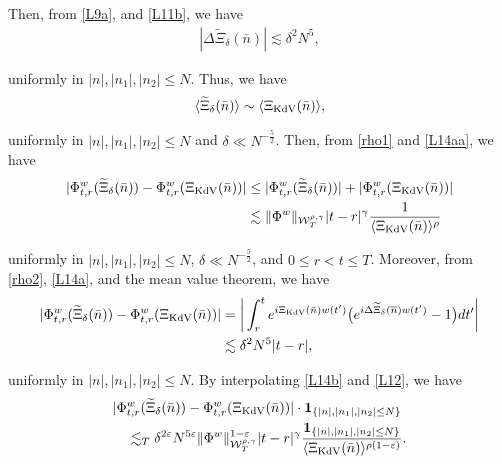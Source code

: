 \documentclass[letterpaper, 11pt,  reqno]{amsart}
\newcommand{\1}{\hspace{0.5mm}\text{I}\hspace{0.5mm}}
\newcommand{\noi}{\noindent}
\newcommand{\dl}{\delta}
\newcommand{\Dl}{\Delta}
\newcommand{\eps}{\varepsilon}
\newcommand{\g}{\gamma}
\newcommand{\wt}{\widetilde}
\newcommand{\cj}{\overline}
\newcommand{\les}{\lesssim}
\newcommand{\jb}[1]
{\langle #1 \rangle}
\newcommand{\ind}{\mathbf 1}
\newcommand{\W}{\mathcal{W}}
\newcommand{\KDV}{\text{\rm KdV} }
\numberwithin{equation}{section}
\numberwithin{theorem}{section}
\begin{document}
\noi
Then,  from \eqref{L9a}, 
and  \eqref{L11b}, we have 
\begin{align}
|\Dl \wt \Xi_\dl (\bar n)|
\les  \dl^2N^5, 
 \label{L14a}
\end{align}

\noi
uniformly in   $|n|, |n_1|, |n_2|\le N$.
Thus, we have 
\begin{align}
\jb{\wt \Xi_\dl (\bar n)}
\sim \jb{ \Xi_\KDV (\bar n)}, 
 \label{L14aa}
\end{align}

\noi
uniformly in  $|n|, |n_1|, |n_2|\le N$
and $\dl \ll N^{-\frac 52}$.
Then, 
from \eqref{rho1}  and \eqref{L14aa}, we have 
\begin{align}
\begin{split}
|\Phi_{t,r}^{w}( \wt \Xi_\dl (\bar n) )
- \Phi_{t,r}^{w} (\Xi_\KDV (\bar n) )|
& \le 
 |\Phi_{t,r}^{w}( \wt \Xi_\dl (\bar n) )|
+ 
|\Phi_{t,r}^{w} (\Xi_\KDV (\bar n) )|\\
& 
\les \|\Phi^w\|_{  \W^{\rho,\g}_T} |t-r|^\g
\frac{1}{\jb{\Xi_\KDV (\bar n )}^\rho}
\end{split}
\label{L14b}
\end{align}


\noi
\noi
uniformly in  $|n|, |n_1|, |n_2|\le N$, 
 $\dl \ll N^{-\frac 52}$, 
 and 
 $0 \leq  r < t \leq T$.
Moreover, 
from  \eqref{rho2},  \eqref{L14a}, and the mean value theorem, 
we have 
\begin{align}
\begin{aligned}
|\Phi_{t,r}^{w}( \wt \Xi_\dl (\bar n) )
- \Phi_{t,r}^{w} (\Xi_\KDV (\bar n) )|
&=
\bigg| \int_r^t  
e^{i  \Xi_\KDV(\bar n)    w(t') } \big( e^{i   \Dl \wt \Xi_\dl (\cj n)   w(t') } - 1 \big)
 d t' 
 \bigg|
 \\
 &\les 
\dl^2  N^5  |t-r|, 
 \end{aligned}
\label{L12}
\end{align}

\noi
uniformly in   $|n|, |n_1|, |n_2|\le N$.
By interpolating \eqref{L14b} and \eqref{L12}, we have
\begin{align}
\begin{aligned}
& |\Phi_{t,r}^{w}( \wt \Xi_\dl (\bar n) ) - 
\Phi_{t,r}^{w} (\Xi_\KDV (\bar n) )| \cdot
\ind_{ \{ |n|, |n_1|, |n_2|\le N \} } \\
&\quad \les_{ T}
\dl^ {2\eps}  N^{5\eps} \|\Phi^w\|_{  \W^{\rho,\g}_T}^{1-\eps}
 |t-r|^\g \frac{\ind_{ \{ |n|, |n_1|, |n_2|\le N \} }}{\jb{\Xi_\KDV (\bar n )}^{\rho(1-\eps)}}.
 \end{aligned}
 \label{L12a}
\end{align}
\end{document}

